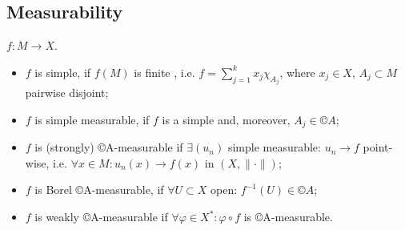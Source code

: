 \documentclass[12pt]{article}					%
\begin{document}
\subsection{Measurability}
\begin{definice}
	$f: M \rightarrow X$.

	\begin{itemize}
		\item $f$ is simple, if $f(M)$ is finite , i.e. $f = \sum_{j=1}^k x_j χ_{A_j}$, where $x_j \in X$, $A_j \subset M$ pairwise disjoint;
		\item $f$ is simple measurable, if $f$ is a simple and, moreover, $A_j \in ©A$;
		\item $f$ is (strongly) ©A-measurable if $\exists (u_n)$ simple measurable: $u_n \rightarrow f$ point-wise, i.e. $\forall x \in M: u_n(x) \rightarrow f(x)$ in $(X, \|·\|)$;
		\item $f$ is Borel ©A-measurable, if $\forall U \subset X$ open: $f^{-1}(U) \in ©A$;
		\item $f$ is weakly ©A-measurable if $\forall φ \in X^*: φ ∘ f$ is ©A-measurable.
	\end{itemize}
\end{definice}
\end{document}
